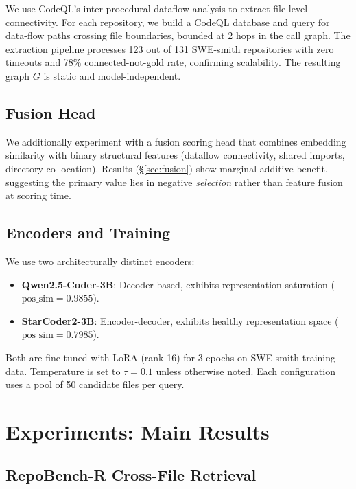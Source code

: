 \documentclass[11pt,a4paper]{article}
\begin{document}
We use CodeQL's inter-procedural dataflow analysis to extract file-level connectivity. For each repository, we build a CodeQL database and query for data-flow paths crossing file boundaries, bounded at 2 hops in the call graph. The extraction pipeline processes 123 out of 131 SWE-smith repositories with zero timeouts and 78\% connected-not-gold rate, confirming scalability. The resulting graph $G$ is static and model-independent.

\subsection{Fusion Head}

We additionally experiment with a fusion scoring head that combines embedding similarity with binary structural features (dataflow connectivity, shared imports, directory co-location). Results (\S\ref{sec:fusion}) show marginal additive benefit, suggesting the primary value lies in negative \emph{selection} rather than feature fusion at scoring time.

\subsection{Encoders and Training}

We use two architecturally distinct encoders:
\begin{itemize}
\item \textbf{Qwen2.5-Coder-3B}: Decoder-based, exhibits representation saturation ($\text{pos\_sim} = 0.9855$).
\item \textbf{StarCoder2-3B}: Encoder-decoder, exhibits healthy representation space ($\text{pos\_sim} = 0.7985$).
\end{itemize}
Both are fine-tuned with LoRA (rank 16) for 3 epochs on SWE-smith training data. Temperature is set to $\tau = 0.1$ unless otherwise noted. Each configuration uses a pool of 50 candidate files per query.

\section{Experiments: Main Results}
\label{sec:main_results}

\subsection{RepoBench-R Cross-File Retrieval}
\label{sec:repobench}
\end{document}
